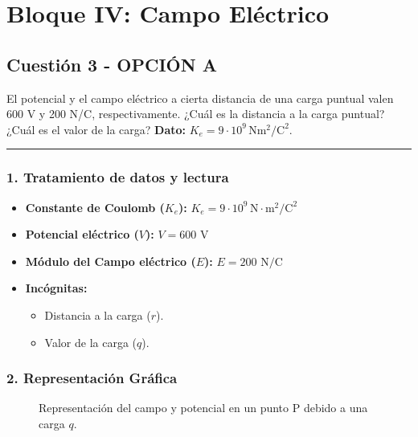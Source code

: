\newpage

\section{Bloque IV: Campo Eléctrico}
\label{sec:electrico_2004_sep_cv}

\subsection{Cuestión 3 - OPCIÓN A}
\label{subsec:4A_2004_sep_cv}

\begin{cajaenunciado}
El potencial y el campo eléctrico a cierta distancia de una carga puntual valen 600 V y 200 N/C, respectivamente. ¿Cuál es la distancia a la carga puntual? ¿Cuál es el valor de la carga?
\textbf{Dato:} $K_{e}=9\cdot10^{9}\,\text{N}\text{m}^2/\text{C}^2$.
\end{cajaenunciado}
\hrule

\subsubsection*{1. Tratamiento de datos y lectura}
\begin{itemize}
    \item \textbf{Constante de Coulomb ($K_e$):} $K_e = 9 \cdot 10^9 \, \text{N}\cdot\text{m}^2/\text{C}^2$
    \item \textbf{Potencial eléctrico ($V$):} $V = 600 \text{ V}$
    \item \textbf{Módulo del Campo eléctrico ($E$):} $E = 200 \text{ N/C}$
    \item \textbf{Incógnitas:}
    \begin{itemize}
        \item Distancia a la carga ($r$).
        \item Valor de la carga ($q$).
    \end{itemize}
\end{itemize}

\subsubsection*{2. Representación Gráfica}
\begin{figure}[H]
    \centering
    \caption{Representación del campo y potencial en un punto P debido a una carga $q$.}
\end{figure}

